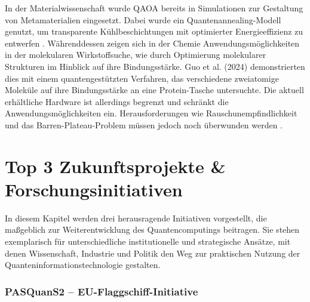 In der Materialwissenschaft wurde QAOA bereits in Simulationen zur Gestaltung von Metamaterialien eingesetzt. Dabei wurde ein Quantenannealing-Modell genutzt, um transparente Kühlbeschichtungen mit optimierter Energieeffizienz zu entwerfen \citealp[18]{guoHarnessingQuantumPower2024}. Währenddessen zeigen sich in der Chemie Anwendungsmöglichkeiten in der molekularen Wirkstoffsuche, wie durch Optimierung molekularer Strukturen im Hinblick auf ihre Bindungsstärke. Guo et al. (2024) demonstrierten dies mit einem quantengestützten Verfahren, das verschiedene zweiatomige Moleküle auf ihre Bindungsstärke an eine Protein-Tasche untersuchte. Die aktuell erhältliche Hardware ist allerdings begrenzt und schränkt die Anwendungsmöglichkeiten ein. Herausforderungen wie Rauschunempfindlichkeit und das Barren-Plateau-Problem müssen jedoch noch überwunden werden \citealp[12]{weidmanQuantumComputingChemistry2024a}.


\section{Top 3 Zukunftsprojekte \& Forschungsinitiativen}

In diesem Kapitel werden drei herausragende Initiativen vorgestellt, die maßgeblich zur Weiterentwicklung des Quantencomputings beitragen. Sie stehen exemplarisch für unterschiedliche institutionelle und strategische Ansätze, mit denen Wissenschaft, Industrie und Politik den Weg zur praktischen Nutzung der Quanteninformationstechnologie gestalten. 

\subsubsection*{PASQuanS2 – EU-Flaggschiff-Initiative}


